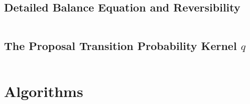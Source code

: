 \subsection{Detailed Balance Equation and Reversibility}
$~$\\

\subsection{The Proposal Transition Probability Kernel $q$}\label{subsc-proposal-kernel}
$~$\\

\section{Algorithms}\label{sc-rmc-algs}

